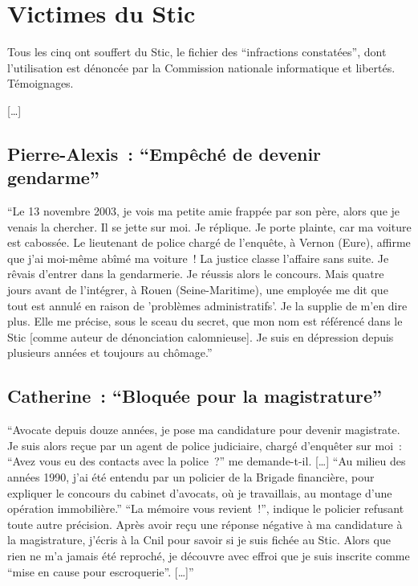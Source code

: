 \section{Victimes du Stic}

Tous les cinq ont souffert du Stic, le fichier des ``infractions constatées'', dont l'utilisation est dénoncée par la Commission nationale informatique et libertés. Témoignages.

[…]

\subsection{Pierre-Alexis : ``Empêché de devenir gendarme''}

``Le 13 novembre 2003, je vois ma petite amie frappée par son père, alors que je venais la chercher. Il se jette sur moi. Je réplique. Je porte plainte, car ma voiture est cabossée. Le lieutenant de police chargé de l'enquête, à Vernon (Eure), affirme que j'ai moi-même abîmé ma voiture ! La justice classe l'affaire sans suite. Je rêvais d'entrer dans la gendarmerie. Je réussis alors le concours. Mais quatre jours avant de l'intégrer, à Rouen (Seine-Maritime), une employée me dit que tout est annulé en raison de 'problèmes administratifs'. Je la supplie de m'en dire plus. Elle me précise, sous le sceau du secret, que mon nom est référencé dans le Stic [comme auteur de dénonciation calomnieuse]. Je suis en dépression depuis plusieurs années et toujours au chômage.'' 

\subsection{Catherine : ``Bloquée pour la magistrature''}

``Avocate depuis douze années, je pose ma candidature pour devenir magistrate. Je suis alors reçue par un agent de police judiciaire, chargé d'enquêter sur moi : ``Avez vous eu des contacts avec la police ?'' me demande-t-il. […] ``Au milieu des années 1990, j'ai été entendu par un policier de la Brigade financière, pour expliquer le concours du cabinet d'avocats, où je travaillais, au montage d'une opération immobilière.'' ``La mémoire vous revient !'', indique le policier refusant toute autre précision. Après avoir reçu une réponse négative à ma candidature à la magistrature, j'écris à la Cnil pour savoir si je suis fichée au Stic. Alors que rien ne m'a jamais été reproché, je découvre avec effroi que je suis inscrite comme ``mise en cause pour escroquerie''. […]''
